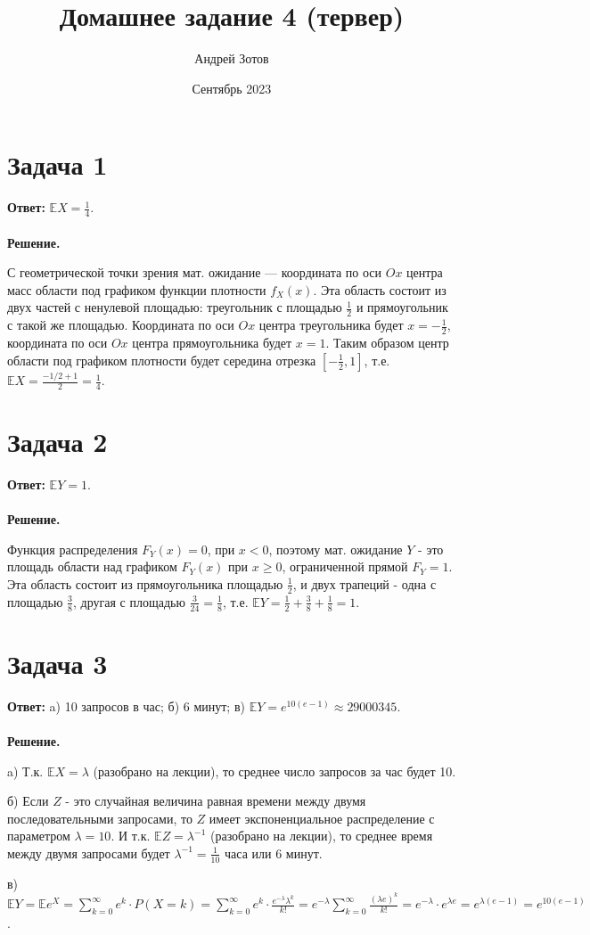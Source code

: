 \documentclass{article}
\title{Домашнее задание 4 (тервер)}
\author{Андрей Зотов}
\date{Сентябрь 2023}
\begin{document}
\maketitle

\section*{Задача 1}
{\bf Ответ: } $\mathbb{E}X=\frac{1}{4}$.
\\
\\
{\bf Решение.}
\par С геометрической точки зрения мат. ожидание — координата по оси $Ox$ центра масс области под графиком функции плотности $f_X(x)$. Эта область состоит из двух частей с ненулевой площадью: треугольник с площадью $\frac{1}{2}$ и прямоугольник с такой же площадью. Координата по оси $Ox$ центра треугольника будет $x=-\frac{1}{2}$, координата по оси $Ox$ центра прямоугольника будет $x=1$. Таким образом центр области под графиком плотности будет середина отрезка $[-\frac{1}{2}, 1]$, т.е. $\mathbb{E}X=\frac{-1/2+1}{2}=\frac{1}{4}$.
\section*{Задача 2}
{\bf Ответ: } $\mathbb{E}Y=1$.
\\
\\
{\bf Решение.}
\par Функция распределения $F_Y(x)=0$, при $x < 0$, поэтому мат. ожидание $Y$ - это площадь области над графиком $F_Y(x)$ при $x \geq 0$, ограниченной прямой $F_Y=1$. Эта область состоит из прямоугольника площадью $\frac{1}{2}$, и двух трапеций - одна с площадью $\frac{3}{8}$, другая с площадью $\frac{3}{24}=\frac{1}{8}$, т.е. $\mathbb{E}Y=\frac{1}{2}+\frac{3}{8}+\frac{1}{8}=1$.
\section*{Задача 3}
{\bf Ответ: } a) 10 запросов в час; б) 6 минут; в) $\mathbb{E}Y=e^{10(e-1)}\approx 29000345$.
\\
\\
{\bf Решение.}
\par
a)
Т.к. $\mathbb{E}X=\lambda$ (разобрано на лекции), то среднее число запросов за час будет 10.
\par
б) Если $Z$ - это случайная величина равная времени между двумя последовательными запросами, то $Z$ имеет экспоненциальное распределение с параметром $\lambda=10$. И т.к. $\mathbb{E}Z=\lambda^{-1}$ (разобрано на лекции), то среднее время между двумя запросами будет $\lambda^{-1}=\frac{1}{10}$ часа или 6 минут.
\par
в) $\mathbb{E}Y=\mathbb{E}e^X=\sum\limits_{k=0}^{\infty}e^k\cdot P(X=k)=\sum\limits_{k=0}^{\infty}e^k\cdot\frac{e^{-\lambda}\lambda^k}{k!}=e^{-\lambda}\sum\limits_{k=0}^{\infty}\frac{(\lambda e)^k}{k!}=e^{-\lambda}\cdot e^{\lambda e}=e^{\lambda(e-1)}=e^{10(e-1)}$.
\end{document}
